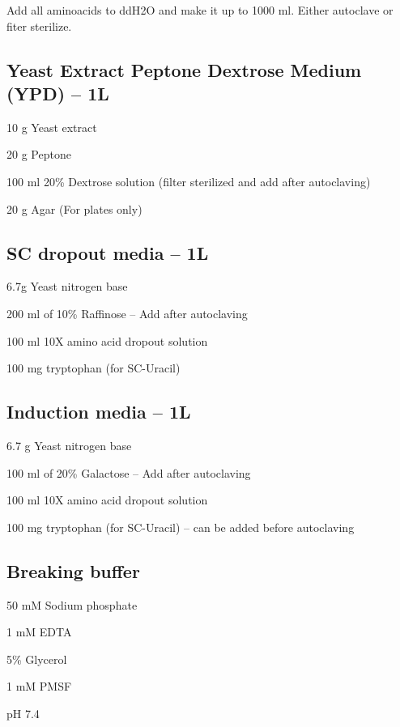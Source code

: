 			Add all aminoacids to ddH{\scriptsize2}O and make it up to 1000 ml. Either autoclave or fiter sterilize.
			
	\subsection{Yeast Extract Peptone Dextrose Medium (YPD) -- 1L}
	\begin{packed_enum}
	 	\item 10 g Yeast extract
		\item 20 g Peptone 
		\item 100 ml 20\% Dextrose solution (filter sterilized and add after autoclaving)
		\item 20 g Agar (For plates only)
	\end{packed_enum}

	\subsection{SC dropout media{} -- 1L}
	\begin{packed_enum}
	 	\item 6.7g Yeast nitrogen base
		\item 200 ml of 10\% Raffinose -- Add after autoclaving
		\item 100 ml 10X amino acid dropout solution
		\item 100 mg tryptophan (for SC-Uracil)
	\end{packed_enum}


	\subsection{Induction media -- 1L}
	\begin{packed_enum}
	 	\item 6.7 g Yeast nitrogen base
		\item 100 ml of 20\% Galactose -- Add after autoclaving
		\item 100 ml 10X amino acid dropout solution
		\item 100 mg tryptophan (for SC-Uracil) -- can be added before autoclaving
	\end{packed_enum}
	
	\subsection{Breaking buffer}
	\begin{packed_enum}
	\item 50 mM Sodium phosphate
	\item 1 mM EDTA
	\item 5\% Glycerol
	\item 1 mM PMSF
	\item pH 7.4
	
	\end{packed_enum}
